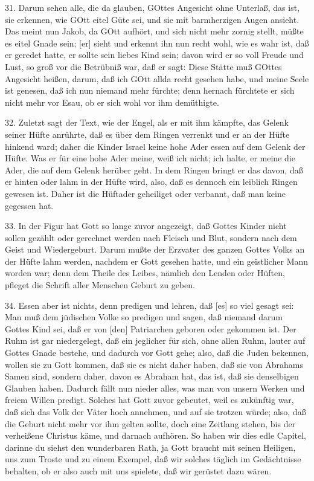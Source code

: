 31. Darum sehen alle, die da glauben, GOttes Angesicht ohne Unterlaß, das ist, sie erkennen, wie GOtt eitel Güte sei, und sie mit barmherzigen Augen ansieht. Das meint nun Jakob, da GOtt aufhört, und sich nicht mehr zornig stellt, müßte es eitel Gnade sein; [er] sieht und erkennt ihn nun recht wohl, wie es wahr ist, daß er geredet hatte, er sollte sein liebes Kind sein; davon wird er so voll Freude und Lust, so groß vor die Betrübniß war, daß er sagt: Diese Stätte muß GOttes Angesicht heißen, darum, daß ich GOtt allda recht gesehen habe, und meine Seele ist genesen, daß ich nun niemand mehr fürchte; denn hernach fürchtete er sich nicht mehr vor Esau, ob er sich wohl vor ihm demüthigte.

32. Zuletzt sagt der Text, wie der Engel, als er mit ihm kämpfte, das Gelenk seiner Hüfte anrührte, daß es über dem Ringen verrenkt und er an der Hüfte hinkend ward; daher die Kinder Israel keine hohe Ader essen auf dem Gelenk der Hüfte. Was er für eine hohe Ader meine, weiß ich nicht; ich halte, er meine die Ader, die auf dem Gelenk herüber geht. In dem Ringen bringt er das davon, daß er hinten oder lahm in der Hüfte wird, also, daß es dennoch ein leiblich
Ringen gewesen ist. Daher ist die Hüftader geheiliget oder verbannt, daß man keine gegessen hat.

33. In der Figur hat Gott so lange zuvor angezeigt, daß Gottes Kinder nicht sollen gezählt oder gerechnet werden nach Fleisch und Blut, sondern nach dem Geist und Wiedergeburt. Darum mußte der Erzvater des ganzen Gottes Volks an der Hüfte lahm werden, nachdem er Gott gesehen hatte, und ein geistlicher Mann worden war; denn dem Theile des Leibes, nämlich den Lenden oder Hüften, pfleget die Schrift aller Menschen Geburt zu geben.

34. Essen aber ist nichts, denn predigen und lehren, daß [es] so viel gesagt sei: Man muß dem jüdischen Volke so predigen und sagen, daß niemand darum Gottes Kind sei, daß er von [den] Patriarchen geboren oder gekommen ist. Der Ruhm ist gar niedergelegt, daß ein jeglicher für sich, ohne allen Ruhm, lauter auf Gottes Gnade bestehe, und dadurch vor Gott gehe; also, daß die Juden bekennen, wollen sie zu Gott kommen, daß sie es nicht daher haben, daß sie von Abrahams Samen sind, sondern daher, davon es Abraham hat, das ist, daß sie denselbigen Glauben haben. Dadurch fällt nun nieder alles, was man von unsern Werken und freiem Willen predigt. Solches hat Gott zuvor gebeutet, weil es zukünftig war, daß sich das Volk der Väter hoch annehmen, und auf sie trotzen würde; also, daß die Geburt nicht mehr vor ihm gelten sollte, doch eine Zeitlang stehen, bis der verheißene Christus käme, und darnach aufhören. So haben wir dies edle Capitel, darinne du siehst den wunderbaren Rath, ja Gott braucht mit seinen Heiligen, uns zum Troste und zu einem Exempel, daß wir solches täglich im Gedächtnisse behalten, ob er also auch mit uns spielete, daß wir gerüstet dazu wären.

